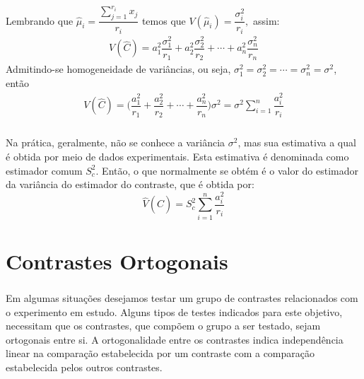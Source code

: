 \documentclass[14pt,aspectratio=1610]{beamer}
\begin{document}
\begin{frame}{}
\frametitle{}
\begin{block}{}
\justifying
Lembrando que $\hat{\mu}_{i}={\displaystyle \dfrac{\sum_{j=1}^{r_{i}}x_{j}}{r_{i}}}$ temos que $V(\hat{\mu}_{i})=\dfrac{\sigma_{i}^{2}}{r_{i}},$ assim:
\begin{align*}
V(\hat{C})=a_{1}^{2}\dfrac{\sigma_{1}^{2}}{r_{1}}+a_{2}^{2}\dfrac{\sigma_{2}^{2}}{r_{2}}+\cdots+a_{n}^{2}\dfrac{\sigma_{n}^{2}}{r_{n}}
\end{align*}
Admitindo-se homogeneidade de variâncias, ou seja, 
$\sigma_{1}^{2}=\sigma_{2}^{2}=\cdots=\sigma_{n}^{2}=\sigma^{2}$, então
\begin{align*}
V(\hat{C})=\Biggl(\dfrac{a_{1}^{2}}{r_{1}}+\dfrac{a_{2}^{2}}{r_{2}}+\cdots+\dfrac{a_{n}^{2}}{r_{n}}\Biggl)\sigma^{2}=\sigma^{2}\sum_{i=1}^{n}\dfrac{a_{i}^{2}}{r_{i}}
\end{align*}
\end{block}
\end{frame}

\begin{frame}{}
\frametitle{}
\begin{block}{}
\justifying
Na prática, geralmente, não se conhece a variância $\sigma^{2}$, mas sua estimativa a qual é obtida por meio de dados experimentais. Esta estimativa é denominada como estimador comum $S_{c}^{2}.$ Então, o que normalmente se obtém é o valor do estimador da variância do estimador do contraste, que é obtida por:
$${\displaystyle \hat{V}(\hat{C})=S_{c}^{2}\sum_{i=1}^{n}\dfrac{a_{i}^{2}}{r_{i}}}$$
\end{block}
\end{frame}

\section{Contrastes Ortogonais}
\begin{frame}{}
\frametitle{}
\begin{block}{}
\justifying
Em algumas situações desejamos testar um grupo de contrastes relacionados com o experimento em estudo. Alguns tipos de testes indicados para este objetivo, necessitam
que os contrastes, que compõem o grupo a ser testado, sejam ortogonais entre si. A ortogonalidade entre os contrastes indica independência linear na comparação estabelecida por um contraste com a comparação estabelecida pelos outros contrastes.
\end{block}
\end{frame}
\end{document}
